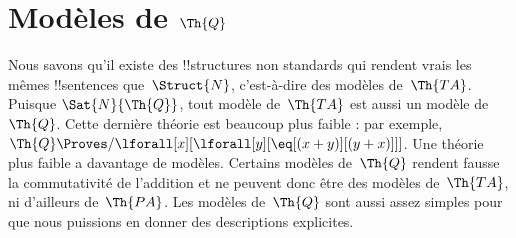 \documentclass[../../../include/open-logic-section]{subfiles}
\begin{document}
\section{Modèles de $\Th{Q}$}

\begin{explain}
Nous savons qu'il existe des !!{structure}s non standards
qui rendent vrais les mêmes !!{sentence}s que~$\Struct{N}$,
c'est-à-dire des modèles de~$\Th{TA}$. Puisque
$\Sat{N}{\Th{Q}}$, tout modèle de~$\Th{TA}$ est
aussi un modèle de~$\Th{Q}$. Cette dernière théorie
est beaucoup plus faible : par exemple,
$\Th{Q}\Proves/
\lforall[x][\lforall[y][\eq[(x+y)][(y+x)]]]$.
Une théorie plus faible a davantage de modèles.
Certains modèles de~$\Th{Q}$ rendent fausse la
commutativité de l'addition et ne peuvent donc
être des modèles de~$\Th{TA}$, ni d'ailleurs
de~$\Th{PA}$. Les modèles de~$\Th{Q}$ sont
aussi assez simples pour que nous puissions
en donner des descriptions explicites.
\end{explain}
\end{document}
